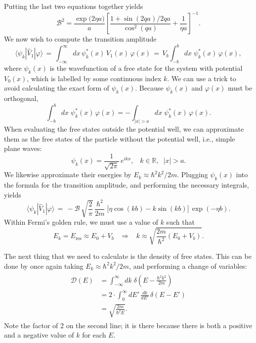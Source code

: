 \documentclass[pra,12pt]{revtex4}
\begin{document}
Putting the last two equations together yields
\begin{equation}
  \mathcal{B}^2 = \frac{\exp\big(2\eta a\big)}{a} \left[\frac{1+\sin(2qa)/2qa}{\cos^2(qa)}+\frac{1}{\eta a}\right]^{-1}.
\end{equation}
We now wish to compute the transition amplitude
\begin{equation}
  \langle\psi_k|\hat{V}_1|\varphi\rangle \,=\, \int_{-\infty}^\infty dx \, \psi_k^*(x)\, V_1(x)\, \varphi(x) \,=\, V_b \int_{-b}^b dx \; \psi_k^*(x) \,\varphi(x),
\end{equation}
where $\psi_k(x)$ is the wavefunction of a free state for the system
with potential $V_0(x)$, which is labelled by some continuous index
$k$.  We can use a trick to avoid calculating the exact form of
$\psi_k(x)$.  Because $\psi_k(x)$ and $\varphi(x)$ must be orthogonal,
\begin{equation}
  \int_{-b}^b dx \; \psi_k^*(x) \,\varphi(x) = - \int_{|x| > a} dx \; \psi_k^*(x) \,\varphi(x).
\end{equation}
When evaluating the free states outside the potential well, we can
approximate them as the free states of the particle without the
potential well, i.e., simple plane waves:
\begin{equation}
  \psi_k(x) = \frac{1}{\sqrt{2\pi}}\, e^{ikx}, \;\;\;k\in\mathbb{R}, \;\;|x|>a.
\end{equation}
We likewise approximate their energies by $E_k \approx \hbar^2k^2/2m$.
Plugging $\psi_k(x)$ into the formula for the transition amplitude,
and performing the necessary integrals, yields
\begin{equation}
  \langle\psi_k|\hat{V}_1|\varphi\rangle \,=\, - \mathcal{B} \, \sqrt{\frac{2}{\pi}} \, \frac{\hbar^2}{2m} \; \big[\eta\cos(kb) - k\sin(kb)\big] \, \exp(-\eta b).
\end{equation}
Within Fermi's golden rule, we must use a value of $k$ such that
\begin{equation}
  E_k = E_{\mathrm{res}} \approx E_0 + V_b \;\;\;\Rightarrow \;\;\; k \approx \sqrt{\frac{2m}{\hbar^2}(E_0+V_b)}.
\end{equation}

The next thing that we need to calculate is the density of free
states.  This can be done by once again taking $E_k \approx
\hbar^2k^2/2m$, and performing a change of variables:
\begin{align}
  \begin{aligned}\mathcal{D}(E) &= \int_{-\infty}^\infty dk \; \delta\left(E-\frac{\hbar^2k^2}{2m}\right) \\ &= 2 \cdot \int_0^\infty dE' \, \frac{dk}{dE'} \, \delta(E-E') \\ &= \sqrt{\frac{2m}{\hbar^2 E}}.
  \end{aligned}
\end{align}
Note the factor of 2 on the second line; it is there because there is
both a positive and a negative value of $k$ for each $E$.
\end{document}
